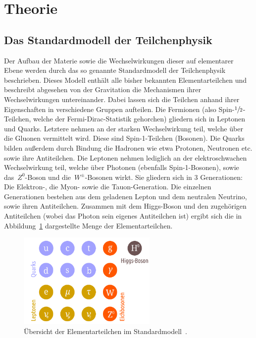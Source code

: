 \section{Theorie}
\label{sec:theorie}

\subsection{Das Standardmodell der Teilchenphysik}

Der Aufbau der Materie sowie die Wechselwirkungen dieser auf elementarer Ebene
werden durch das so genannte Standardmodell der Teilchenphysik beschrieben.
Dieses Modell enthält alle bisher bekannten Elementarteilchen und beschreibt
abgesehen von der Gravitation die Mechanismen ihrer Wechselwirkungen
untereinander. Dabei lassen sich die Teilchen anhand ihrer Eigenschaften in
verschiedene Gruppen aufteilen. Die Fermionen (also
Spin-$\sfrac{1}{2}$-Teilchen, welche der Fermi-Dirac-Statistik gehorchen)
gliedern sich in Leptonen und Quarks. Letztere nehmen an der starken
Wechselwirkung teil, welche über die Gluonen vermittelt wird. Diese sind
Spin-1-Teilchen (Bosonen). Die Quarks bilden außerdem durch Bindung die Hadronen
wie etwa Protonen, Neutronen etc. sowie ihre Antiteilchen. Die Leptonen nehmen
lediglich an der elektroschwachen Wechselwirkung teil, welche über Photonen
(ebenfalls Spin-1-Bosonen), sowie das~$Z^0$-Boson und die~$W^{\pm}$-Bosonen
wirkt. Sie gliedern sich in 3 Generationen: Die Elektron-, die Myon- sowie die
Tauon-Generation. Die einzelnen Generationen bestehen aus dem geladenen Lepton
und dem neutralen Neutrino, sowie ihren Antiteilchen. Zusammen mit dem
Higgs-Boson und den zugehörigen Antiteilchen (wobei das Photon sein eigenes
Antiteilchen ist) ergibt sich die in Abbildung~\ref{fig:sm} dargestellte Menge
der Elementarteilchen.

\begin{figure}[htb]
  \centering
  \includegraphics[width=0.6\textwidth]{figures/standardmodell.png}
  \caption{Übersicht der Elementarteilchen im Standardmodell~\cite{KevinBA}.}
  \label{fig:sm}
\end{figure}

